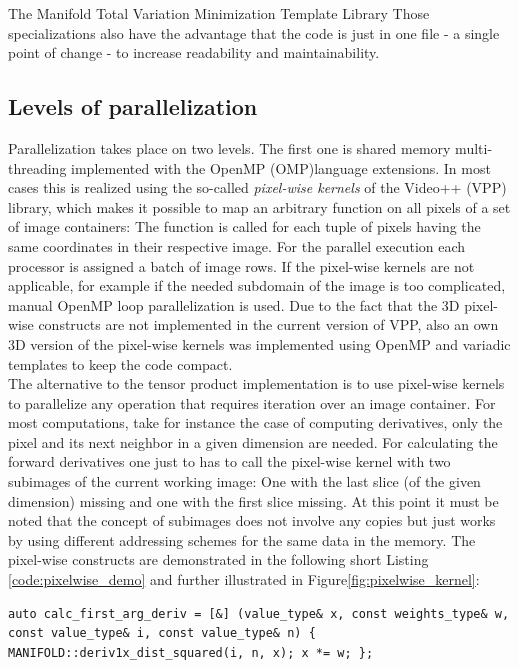 \begin{chapter}{The Manifold Total Variation Minimization Template Library}
Those specializations also have the advantage that the code is just in one file - a single point of change - to increase readability and maintainability.


\subsection{Levels of parallelization} %
\label{sub:Levels of parallelization}
Parallelization takes place on two levels. The first one is shared memory multi-threading implemented with the OpenMP (OMP)language extensions. In most cases this is realized 
using the so-called \textit{pixel-wise kernels} of the Video++ (VPP) library, which makes it possible to map an arbitrary function on all pixels of a set of image containers: The function is
called for each tuple of pixels having the same coordinates in their respective image. For the parallel execution each processor is assigned a batch of image rows.
If the pixel-wise kernels are not applicable, for example if the needed subdomain of the image is too complicated, manual OpenMP loop parallelization is used. Due to the fact that the 3D pixel-wise constructs are not 
implemented in the current version of VPP, also an own 3D version of the pixel-wise kernels 
was implemented using OpenMP and variadic templates to keep the code compact.\\

The alternative to the tensor product implementation is to use pixel-wise kernels to parallelize any operation that requires iteration over an image container.
For most computations, take for instance the case of computing derivatives, only the pixel and its next neighbor in a given dimension are needed. For calculating the forward derivatives one just 
to has to call the pixel-wise kernel with two subimages of the current working image: One with the last slice (of the given dimension) missing and one with the first slice missing. At this point it must be noted that the concept of subimages does not
involve any copies but just works by using different addressing schemes for the same
data in the memory.
The pixel-wise constructs are demonstrated in the following short Listing \ref{code:pixelwise_demo} and further illustrated in Figure\ref{fig:pixelwise_kernel}:\\

\cppinline
\begin{lstlisting}[label=code:pixelwise_demo,caption={Pixel-wise forward derivative computation}]
auto calc_first_arg_deriv = [&] (value_type& x, const weights_type& w, const value_type& i, const value_type& n) { MANIFOLD::deriv1x_dist_squared(i, n, x); x *= w; }; 


\end{lstlisting}
\end{chapter}
